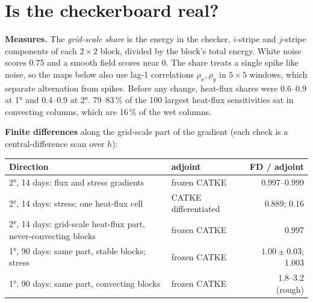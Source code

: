 \documentclass[10pt]{article}
\begin{document}
\section{Is the checkerboard real?}

\textbf{Measures.} The \emph{grid-scale share} is the energy in the checker, $i$-stripe and $j$-stripe components of
each $2\times2$ block, divided by the block's total energy. White noise scores 0.75 and a smooth field scores near 0.
The share treats a single spike like noise, so the maps below also use lag-1 correlations $\rho_x, \rho_y$ in
$5\times5$ windows, which separate alternation from spikes. Before any change, heat-flux shares were 0.6--0.9 at
\ang{1} and 0.4--0.9 at \ang{2}. 79--83\,\% of the 100 largest heat-flux sensitivities sat in convecting columns,
which are 16\,\% of the wet columns.

\textbf{Finite differences} along the grid-scale part of the gradient (each check is a central-difference scan
over $h$):

\begin{center}\small
\begin{tabular}{@{}p{}lr@{}}
\toprule
Direction & adjoint & FD / adjoint \\
\midrule
\ang{2}, 14 days: flux and stress gradients & frozen CATKE & 0.997--0.999 \\
\ang{2}, 14 days: stress; one heat-flux cell & CATKE differentiated & 0.889; 0.16 \\
\ang{2}, 14 days: grid-scale heat-flux part, never-convecting blocks & frozen CATKE & 0.997 \\
\ang{1}, 90 days: same part, stable blocks; stress & frozen CATKE & $1.00 \pm 0.03$; 1.003 \\
\ang{1}, 90 days: same part, convecting blocks & frozen CATKE & 1.8--3.2 (rough) \\
\bottomrule
\end{tabular}
\end{center}
\end{document}
